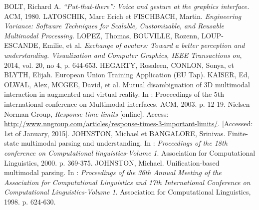 \documentclass[a4paper]{article}
\begin{document}
\begin{thebibliography}{1}
	 BOLT, Richard A. \textit{“Put-that-there”: Voice and gesture at the graphics interface.} ACM, 1980.
	 LATOSCHIK, Marc Erich et FISCHBACH, Martin. \textit{Engineering Variance: Software Techniques for Scalable, Customizable, and Reusable Multimodal Processing.}
	 LOPEZ, Thomas, BOUVILLE, Rozenn, LOUP-ESCANDE, Emilie, et al. \textit{Exchange of avatars: Toward a better perception and understanding. Visualization and Computer Graphics, IEEE Transactions on}, 2014, vol. 20, no 4, p. 644-653.
	 HEGARTY, Rosaleen, CONLON, Sonya, et BLYTH, Elijah. European Union Training Application (EU Tap).
	 KAISER, Ed, OLWAL, Alex, MCGEE, David, et al. Mutual disambiguation of 3D multimodal interaction in augmented and virtual reality. In : Proceedings of the 5th international conference on Multimodal interfaces. ACM, 2003. p. 12-19.
	 Nielsen Norman Group, \textit{Response time limits} [online]. Access: \url{http://www.nngroup.com/articles/response-times-3-important-limits/}. [Accessed: 1st of January, 2015].
	 JOHNSTON, Michael et BANGALORE, Srinivas. Finite-state multimodal parsing and understanding. In : \textit{Proceedings of the 18th conference on Computational linguistics-Volume 1}. Association for Computational Linguistics, 2000. p. 369-375.
	 JOHNSTON, Michael. Unification-based multimodal parsing. In : \textit{Proceedings of the 36th Annual Meeting of the Association for Computational Linguistics and 17th International Conference on Computational Linguistics-Volume 1}. Association for Computational Linguistics, 1998. p. 624-630.
\end{thebibliography}
\end{document}
